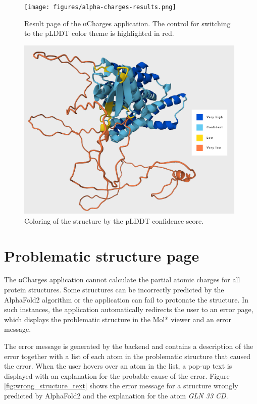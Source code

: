 \documentclass[
  digital,     %
  oneside,     %
  nosansbold,  %
  nocolorbold, %
  lof,         %
  lot,         %
]{fithesis4}
\begin{document}
\begin{figure}[htbp]
  \begin{center}
    \texttt{[image: figures/alpha-charges-results.png]}
  \end{center}
  \caption[Result page of the αCharges application.]{Result page of the αCharges application. The control for switching to the pLDDT color theme is highlighted in red.}
  \label{fig:alpha-charges-results}
\end{figure}

\begin{figure}[htbp]
  \begin{center}
    \includegraphics[width=11cm]{figures/alphafold_coloring.png}
  \end{center}
  \caption{Coloring of the structure by the pLDDT confidence score.}
  \label{fig:alphafold-coloring}
\end{figure}

\section{Problematic structure page}

The αCharges application cannot calculate the partial atomic charges for all protein structures. Some structures can be incorrectly predicted by the AlphaFold2 algorithm or the application can fail to protonate the structure.
\cite{jumper2021alphafold} In such instances, the application automatically redirects the user to an error page, which displays the problematic structure in the Mol* viewer and an error message.

The error message is generated by the backend and contains a description of the error together with a list of each atom in the problematic structure that caused the error. When the user hovers over an atom in the list, a pop-up text is displayed with an explanation for the probable cause of the error. Figure \ref{fig:wrong_structure_text} shows the error message for a structure wrongly predicted by AlphaFold2 and the explanation for the atom \textit{GLN 33 CD}.
\end{document}
